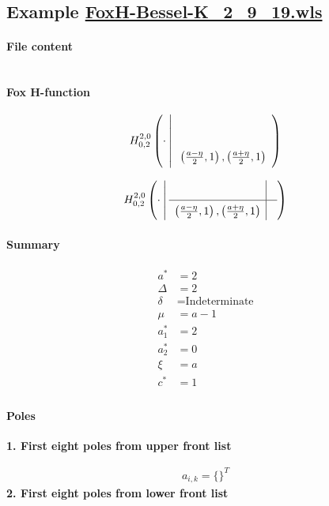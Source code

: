 \documentclass[preview]{standalone}
\begin{document}
\subsection{Example \url{FoxH-Bessel-K_2_9_19.wls}}

\paragraph{File content}

\inputminted{text}{../Examples/FoxH-Bessel-K_2_9_19.wls}

\paragraph{Fox H-function}

\begin{align*}
  \FoxH
    {2,0}
    {0,2}
    {\cdot}
    {}
    {\left(\frac{a-\eta }{2}, 1\right), \left(\frac{a+\eta }{2}, 1\right)}
\end{align*}

\begin{align*}
  \FoxHext
    {2,0}
    {0,2}
    {\cdot}
    {}
    {}
    {\left(\frac{a-\eta }{2}, 1\right), \left(\frac{a+\eta }{2}, 1\right)}
    {}
\end{align*}

\paragraph{Summary}

\begin{align*}
  a^*    & = 2 \\
  \Delta & = 2 \\
  \delta & = \text{Indeterminate} \\
  \mu    & = a-1 \\
  a_1^*  & = 2 \\
  a_2^*  & = 0 \\
  \xi    & = a \\
  c^*    & = 1 \\
\end{align*}

\paragraph{Poles}

\noindent\textbf{1. First eight poles from upper front list}

\begin{align*}
  a_{i,k} = 
  \{\}^T 
\end{align*}
\noindent\textbf{2. First eight poles from lower front list}
\end{document}
